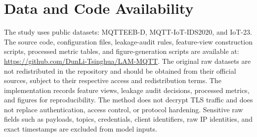 \documentclass[lettersize,journal]{IEEEtran}
\begin{document}
\section*{Data and Code Availability}
The study uses public datasets: MQTTEEB-D, MQTT-IoT-IDS2020, and IoT-23. The source code, configuration files, leakage-audit rules, feature-view construction scripts, processed metric tables, and figure-generation scripts are available at: \url{https://github.com/DunLi-Tsinghua/LAM-MQTT}. The original raw datasets are not redistributed in the repository and should be obtained from their official sources, subject to their respective access and redistribution terms. The implementation records feature views, leakage audit decisions, processed metrics, and figures for reproducibility. The method does not decrypt TLS traffic and does not replace authentication, access control, or protocol hardening. Sensitive raw fields such as payloads, topics, credentials, client identifiers, raw IP identities, and exact timestamps are excluded from model inputs.



\end{document}
